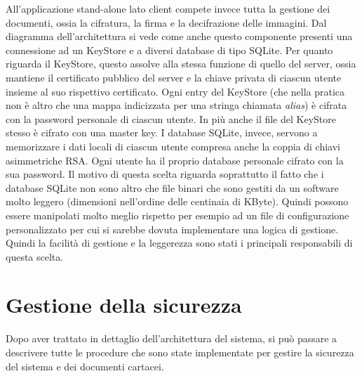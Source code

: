All'applicazione stand-alone lato client compete invece tutta la gestione dei documenti, ossia la cifratura, la firma e la decifrazione delle immagini. Dal diagramma dell'architettura si vede come anche questo componente presenti una connessione ad un KeyStore e a diversi database di tipo SQLite. Per quanto riguarda il KeyStore, questo assolve alla stessa funzione di quello del server, ossia mantiene il certificato pubblico del server e la chiave privata di ciascun utente insieme al suo rispettivo certificato. Ogni entry del KeyStore (che nella pratica non è altro che una mappa indicizzata per una stringa chiamata \emph{alias}) è cifrata con la password personale di ciascun utente. In più anche il file del KeyStore stesso è cifrato con una master key.
I database SQLite, invece, servono a memorizzare i dati locali di ciascun utente compresa anche la coppia di chiavi asimmetriche RSA. Ogni utente ha il proprio database personale cifrato con la sua password.
Il motivo di questa scelta riguarda soprattutto il fatto che i database SQLite non sono altro che file binari che sono gestiti da un software molto leggero (dimensioni nell'ordine delle centinaia di KByte). Quindi possono essere manipolati molto meglio rispetto per esempio ad un file di configurazione personalizzato per cui si sarebbe dovuta implementare una logica di gestione.
Quindi la facilità di gestione e la leggerezza sono stati i principali responsabili di questa scelta.

\section{Gestione della sicurezza}
	\label{sec:sicurezza}
Dopo aver trattato in dettaglio dell'architettura del sistema, si può passare a descrivere tutte le procedure che sono state implementate per gestire la sicurezza del sistema e dei documenti cartacei.
